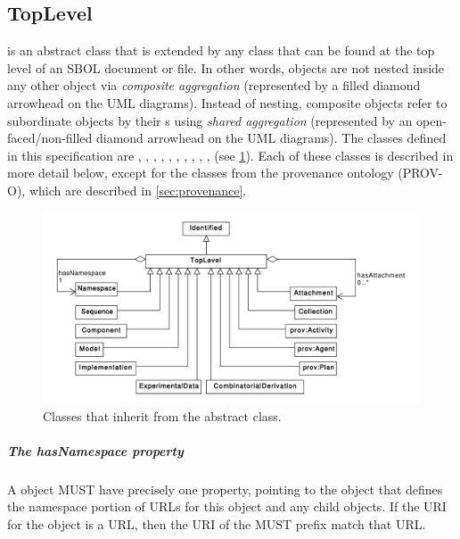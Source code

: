 \subsection {TopLevel}
\label{sec:TopLevel}
 is an abstract class that is extended by any  class that can be found at the top level of an SBOL document or file.
In other words,  objects are not nested inside any other object via \textit{composite aggregation} (represented by a filled diamond arrowhead on the UML diagrams).
Instead of nesting, composite  objects refer to subordinate  objects by their s using \textit{shared aggregation} (represented by an open-faced/non-filled diamond arrowhead on the UML diagrams).
The  classes defined in this specification are , , , , , , , , , ,  (see \ref{uml:toplevel}).
Each of these classes is described in more detail below, except for the classes from the provenance ontology (PROV-O), which are described in \ref{sec:provenance}.


\begin{figure}[ht]
\begin{center}
\includegraphics[width=\textwidth]{uml/toplevel}
\caption[]{Classes that inherit from the  abstract class.}
\label{uml:toplevel}
\end{center}
\end{figure}

\subparagraph{The hasNamespace property}
\label{sec:hasNamespace}
A  object MUST have precisely one  property, pointing to the  object that defines the namespace portion of URLs for this object and any child objects.
If the URI for the  object is a URL, then the URI of the  MUST prefix match that URL.

